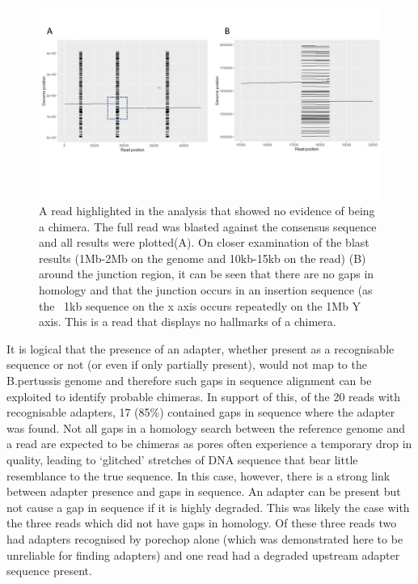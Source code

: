 \begin{figure}[h!]
\centering
\includegraphics[width=\textwidth{}]{Chapter_2/Read 9(2).jpg}
\caption{ A read highlighted in the analysis that showed no evidence of being a chimera. The full read was blasted against the consensus sequence and all results were plotted(A). On closer examination of the blast results (1Mb-2Mb on the genome and 10kb-15kb on the read) (B) around the junction region, it can be seen that there are no gaps in homology and that the junction occurs in an insertion sequence (as the ~1kb sequence on the x axis occurs repeatedly on the 1Mb Y axis. This is a read that displays no hallmarks of a chimera.}
\label{fig:Heatmap}
\end{figure}

It is logical that the presence of an adapter, whether present as a recognisable sequence or not (or even if only partially present), would not map to the B.pertussis genome and therefore such gaps in sequence alignment can be exploited to identify probable chimeras. In support of this, of the 20 reads with recognisable adapters, 17 (85\%) contained gaps in sequence where the adapter was found. Not all gaps in a homology search between the reference genome and a read are expected to be chimeras as pores often experience a temporary drop in quality, leading to `glitched' stretches of DNA sequence that bear little resemblance to the true sequence. In this case, however, there is a strong link between adapter presence and gaps in sequence. An adapter can be present but not cause a gap in sequence if it is highly degraded. This was likely the case with the three reads which did not have gaps in homology. Of these three reads two had adapters recognised by porechop alone (which was demonstrated here to be unreliable for finding adapters) and one read had a degraded upstream adapter sequence present.


